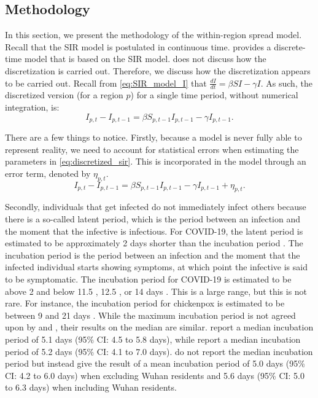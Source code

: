 \documentclass[12pt]{article}
\begin{document}
	\subsection{Methodology} \label{subsec:model_within_methodology}
	In this section, we present the methodology of the within-region spread model. Recall that the SIR model is postulated in continuous time. \textcite{adda2016economic} provides a discrete-time model that is based on the SIR model. \textcite{adda2016economic} does not discuss how the discretization is carried out. Therefore, we discuss how the discretization appears to be carried out. Recall from \eqref{eq:SIR_model_I} that $\frac{dI}{dt} = \beta SI - \gamma I$. As such, the discretized version (for a region $p$) for a single time period, without numerical integration, is:
	    \begin{equation}\label{eq:discretized_sir}
	        I_{p,t} - I_{p,t-1} = \beta S_{p,t-1}I_{p,t-1} - \gamma I_{p,t-1}.
	    \end{equation}
	   
	There are a few things to notice. Firstly, because a model is never fully able to represent reality, we need to account for statistical errors when estimating the parameters in \eqref{eq:discretized_sir}. This is incorporated in the model through an error term, denoted by $\eta_{p,t}$.
	    \begin{equation}\label{eq:discretized_sir_error}
	        I_{p,t} - I_{p,t-1} = \beta S_{p,t-1}I_{p,t-1} - \gamma I_{p,t-1} + \eta_{p,t}.
	    \end{equation}
	
	Secondly, individuals that get infected do not immediately infect others because there is a so-called latent period, which is the period between an infection and the moment that the infective is infectious. For COVID-19, the latent period is estimated to be approximately 2 days shorter than the incubation period \parencite{he2020temporal}. The incubation period is the period between an infection and the moment that the infected individual starts showing symptoms, at which point the infective is said to be symptomatic. The incubation period for COVID-19 is estimated to be above 2 and below 11.5 \parencite{lauer2020incubation}, 12.5 \parencite{li2020incubation}, or 14 days \parencite{linton2020incubation}. This is a large range, but this is not rare. For instance, the incubation period for chickenpox is estimated to be between 9 and 21 days \parencite{papadopoulos2018chickenpox}. While the maximum incubation period is not agreed upon by \textcite{lauer2020incubation} and \textcite{li2020incubation}, their results on the median are similar. \textcite{lauer2020incubation} report a median incubation period of 5.1 days (95\% CI: 4.5 to 5.8 days), while \textcite{li2020incubation} report a median incubation period of 5.2 days (95\% CI: 4.1 to 7.0 days). \textcite{linton2020incubation} do not report the median incubation period but instead give the result of a mean incubation period of 5.0 days (95\% CI: 4.2 to 6.0 days) when excluding Wuhan residents and 5.6 days (95\% CI: 5.0 to 6.3 days) when including Wuhan residents. \\
	
\end{document}
